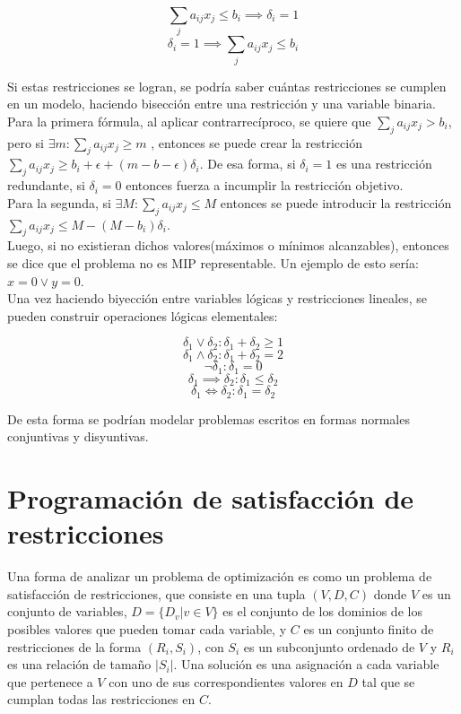 \documentclass[12pt]{report}
\begin{document}
$$ \sum_j a_{ij}x_j \leq  b_i \implies  \delta_i = 1$$
$$  \delta_i = 1 \implies  \sum_j a_{ij}x_j \leq  b_i$$

Si estas restricciones se logran, se podría saber cuántas restricciones se cumplen en un modelo, haciendo bisección entre una restricción y una variable binaria.\\

Para la primera fórmula, al aplicar contrarrecíproco, se quiere que $\sum_j a_{ij}x_j > b_i$, pero si $\exists m:\sum_j a_{ij}x_j\geq  m$ , entonces se puede crear la restricción $\sum_j a_{ij}x_j \geq  b_i+\epsilon+(m-b-\epsilon)\delta_i$. De esa forma, si $\delta_i=1$ es una restricción redundante, si $\delta_i=0$ entonces fuerza a incumplir la restricción objetivo.\\

Para la segunda, si $\exists M:\sum_j a_{ij}x_j\leq  M$ entonces se puede introducir la restricción $\sum_j a_{ij}x_j \leq  M-(M-b_i)\delta_i$. \\

Luego, si no existieran dichos valores(máximos o mínimos alcanzables), entonces se dice que el problema no es MIP representable. Un ejemplo de esto sería: $x=0\lor  y=0$.\\

Una vez haciendo biyección entre variables lógicas y restricciones lineales, se pueden construir operaciones lógicas elementales:

$$\delta_1 \lor  \delta_2:\delta_1+\delta_2\geq 1$$
$$\delta_1 \land \delta_2:\delta_1+\delta_2=2$$
$$\neg\delta_1 :\delta_1=0$$
$$\delta_1 \implies  \delta_2:\delta_1\leq  \delta_2$$
$$\delta_1 \iff \delta_2:\delta_1=\delta_2$$

De esta forma se podrían modelar problemas escritos en formas normales conjuntivas y disyuntivas.

\section{Programación de satisfacción de restricciones}

Una forma de analizar un problema de optimización es como un problema de satisfacción de restricciones, que consiste en una tupla $(V,D,C)$ donde $V$ es un conjunto de variables, $D=\{D_v|v\in V\}$ es el conjunto de los dominios de los posibles valores que pueden tomar cada variable, y $C$ es un conjunto finito de restricciones de la forma $(R_i,S_i)$, con $S_i$ es un subconjunto ordenado de $V$ y $R_i$ es una relación de tamaño $|S_i|$. Una solución es una asignación a cada variable que pertenece a $V$ con uno de sus correspondientes valores en $D$ tal que se cumplan todas las restricciones en $C$.
\end{document}
